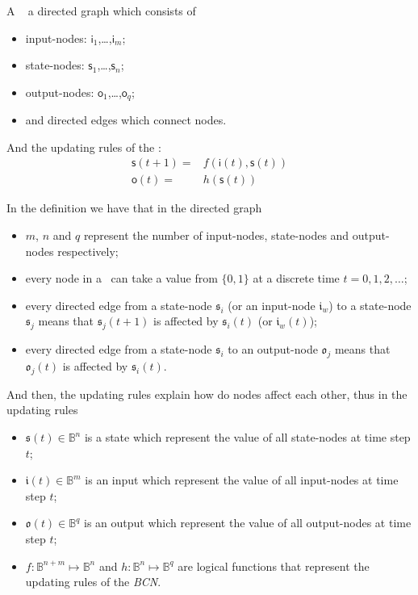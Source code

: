 \begin{definition} A \BCN\ %
	a directed graph which consists of 
	\begin{itemize}
	\item input-nodes: {$\mathsf{i}_1$,\ldots ,$\mathsf{i}_m$};
	\item state-nodes: {$\mathsf{s}_1$,\ldots ,$\mathsf{s}_n$};
	\item output-nodes: {$\mathsf{o}_1$,\ldots ,$\mathsf{o}_q$};
	\item and directed edges which connect nodes. 
\end{itemize}
	
And the updating rules of the \BCN:
\begin{equation}
\begin{split}
\mathsf{s}(t+1)=&f(\mathsf{i}(t),\mathsf{s}(t))\\
\mathsf{o}(t)=&h(\mathsf{s}(t))
\end{split}
\label{equ:1}
\end{equation}

 \end{definition}
In the definition we have that in the directed graph
\begin{itemize}
	\item $m$, $n$ and $q$ represent the number of input-nodes, state-nodes and output-nodes respectively;
          \item every node in a \BCN\ can take a value from $\{0,1\}$ at a discrete time $t=0, 1, 2,\ldots$;
	\item every directed edge from a state-node $\mathfrak{s}_i$ (or an input-node $\mathfrak{i}_w$) to a state-node $\mathfrak{s}_j$ means that  $\mathfrak{s}_j(t+1)$ is affected by $\mathfrak{s}_i(t)$ (or $\mathfrak{i}_w(t)$);	
	\item every directed edge from a state-node $\mathfrak{s}_i$ to an output-node $\mathfrak{o}_j$ means that   $\mathfrak{o}_j(t)$  is affected by $\mathfrak{s}_i(t)$.  
	\end{itemize}
And then, the updating rules explain how do nodes affect each other, thus in the updating rules
	\begin{itemize}
	\item $\mathfrak{s}(t)\in \mathbb{B}^n$ is a state which represent the value of all state-nodes at time step $t$; 	
	\item $\mathfrak{i}(t)\in \mathbb{B}^m$ is an input which represent the value of all input-nodes at time step $t$; 	
	\item $\mathfrak{o}(t)\in \mathbb{B}^q$ is an output which represent the value of all output-nodes at time step $t$;  
	\item $f:\mathbb{B}^{n+m}\mapsto \mathbb{B}^n$ and $h:\mathbb{B}^n\mapsto \mathbb{B}^q$ are logical functions that represent the updating rules of the {\em BCN}. 
	
\end{itemize}


